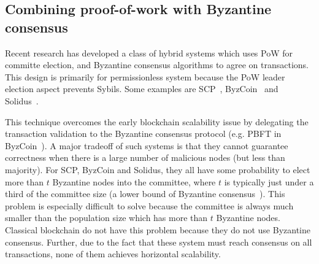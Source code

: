
\subsection{Combining proof-of-work with Byzantine consensus}
Recent research has developed a class of hybrid systems which uses PoW for committe election,
and Byzantine consensus algorithms to agree on transactions.
This design is primarily for permissionless system because the PoW leader election aspect prevents Sybils.
Some examples are SCP~\cite{luu2015scp}, ByzCoin~\cite{kogias2016enhancing} and Solidus~\cite{abraham2016solidus}.

This technique overcomes the early blockchain scalability issue by delegating the transaction validation to the Byzantine consensus protocol (e.g. PBFT in ByzCoin~\cite{kogias2016enhancing}).
A major tradeoff of such systems is that they cannot guarantee correctness when there is a large number of malicious nodes (but less than majority).
For SCP, ByzCoin and Solidus, they all have some probability to elect more than $t$ Byzantine nodes into the committee,
where $t$ is typically just under a third of the committee size (a lower bound of Byzantine consensus~\cite{pease1980reaching}).
This problem is especially difficult to solve because the committee is always much smaller than the population size which has more than $t$ Byzantine nodes.
Classical blockchain do not have this problem because they do not use Byzantine consensus.
Further, due to the fact that these system must reach consensus on all transactions, none of them achieves horizontal scalability.


